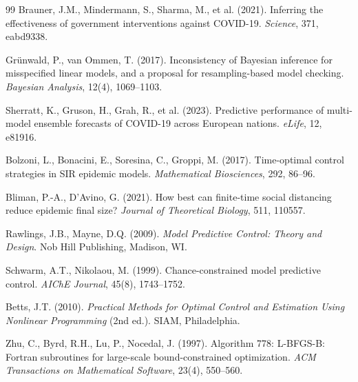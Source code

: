 \documentclass[11pt]{article}
\begin{document}
\begin{thebibliography}{99}
Brauner, J.M., Mindermann, S., Sharma, M., et al. (2021).
Inferring the effectiveness of government interventions against COVID-19.
\emph{Science}, 371, eabd9338.

Gr\"{u}nwald, P., van Ommen, T. (2017).
Inconsistency of Bayesian inference for misspecified linear models, and
a proposal for resampling-based model checking.
\emph{Bayesian Analysis}, 12(4), 1069--1103.

Sherratt, K., Gruson, H., Grah, R., et al. (2023).
Predictive performance of multi-model ensemble forecasts of COVID-19
across European nations.
\emph{eLife}, 12, e81916.

Bolzoni, L., Bonacini, E., Soresina, C., Groppi, M. (2017).
Time-optimal control strategies in SIR epidemic models.
\emph{Mathematical Biosciences}, 292, 86--96.

Bliman, P.-A., D'Avino, G. (2021).
How best can finite-time social distancing reduce epidemic final size?
\emph{Journal of Theoretical Biology}, 511, 110557.

Rawlings, J.B., Mayne, D.Q. (2009).
\emph{Model Predictive Control: Theory and Design}.
Nob Hill Publishing, Madison, WI.

Schwarm, A.T., Nikolaou, M. (1999).
Chance-constrained model predictive control.
\emph{AIChE Journal}, 45(8), 1743--1752.

Betts, J.T. (2010).
\emph{Practical Methods for Optimal Control and Estimation Using
Nonlinear Programming} (2nd ed.).
SIAM, Philadelphia.

Zhu, C., Byrd, R.H., Lu, P., Nocedal, J. (1997).
Algorithm 778: L-BFGS-B: Fortran subroutines for large-scale
bound-constrained optimization.
\emph{ACM Transactions on Mathematical Software}, 23(4), 550--560.

\end{thebibliography}
\end{document}
